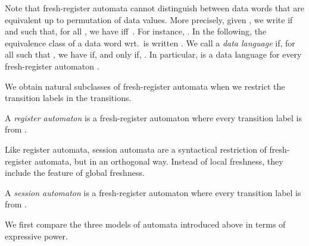 \documentclass{LMCS}
\begin{document}
Note that fresh-register automata cannot distinguish
between data words that are equivalent up to permutation of data
values. More precisely, given , we write 
if  and  such that, for all , we have  iff\ .
For instance, .
In the following, the equivalence class of a data word
 wrt.\  is written .
We call  a \emph{data language} if,
for all  such that , we have  if, and only if, . In particular,  is a data language for every fresh-register automaton .

We obtain natural subclasses of fresh-register automata when we
restrict the transition labels  in the transitions.

\begin{defi}
  A \emph{register automaton} is a fresh-register automaton where
  every transition label is from .
\end{defi}

Like register automata, session automata are a syntactical restriction
of fresh-register automata, but in an orthogonal way. Instead of local
freshness, they include the feature of global freshness.

\begin{defi}
  A \emph{session automaton} is a fresh-register automaton where every
  transition label is from .
\end{defi}

We first compare the three models of automata introduced above in
terms of expressive power.
\end{document}
